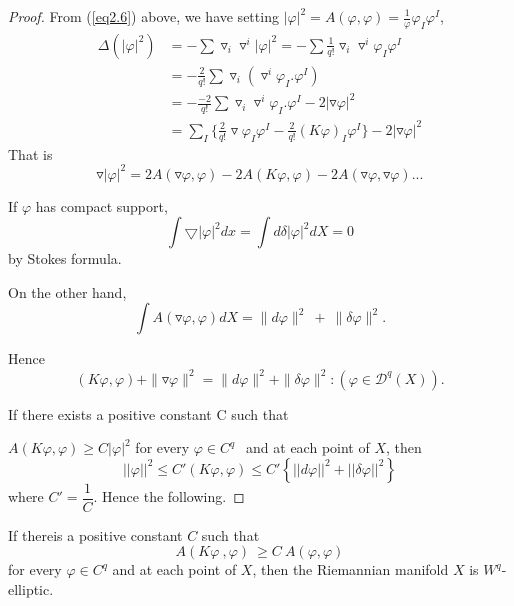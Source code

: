 \begin{proof}
  From (\ref{eq2.6}) above, we have setting $|\varphi |^2 =
  A(\varphi,\varphi)=\frac{1}{\varphi}\varphi_I \varphi^I$, 
  \begin{align*}
    \Delta(| \varphi |^2) & =-\sum \triangledown_i \triangledown^i
    |\varphi|^2 = - \sum \frac {1}{q!} \triangledown_i \triangledown^i
    \varphi_I \varphi^I\\ 
    &=-\frac{2}{q!}\sum \triangledown_i (\triangledown^i \varphi_I
    .\varphi^I)\\ 
    &=-\frac{-2}{q!}\sum \triangledown_i \triangledown^i \varphi_I
    .\varphi^I-2|\triangledown \varphi|^2\\ 
    &=\sum_I \bigg \{\frac {2}{q!} \triangledown \varphi_I \varphi^I
    - \frac{2}{q!}(K \varphi)_I \varphi^I\bigg \}-2|\triangledown
    \varphi|^2 
  \end{align*}
  That is
  $$ 
  \triangledown|\varphi|^2= 2 A(\triangledown \varphi,\varphi)-2A(K
  \varphi,\varphi)-2A (\triangledown \varphi, \triangledown
  \varphi)...
  $$ 

  If $\varphi$ has compact support,
  $$
  \int \bigtriangledown | \varphi|^2 dx=\int d \delta|\varphi|^2  dX=0
  $$ 
  by Stokes formula.

On the other hand,
  $$ 
  \int A (\triangledown \varphi, \varphi) dX = \parallel d \varphi
  \parallel^2~+ ~\parallel \delta \varphi \parallel^2.
  $$

  Hence
  $$ 
  (K \varphi,\varphi)+\parallel \triangledown \varphi \parallel^2 =
  \parallel d \varphi \parallel^2 +\parallel \delta \varphi
  \parallel^2:(\varphi \in \mathscr{D}^q(X)).
  $$

  If there exists a positive constant C such that
  
  $ A (K \varphi,\varphi)\ge C|\varphi|^2$ for every $\varphi \in C^q
  ~~ $ and at each point of $X$, then  
  $$ 
  ||\varphi||^2 \leq C' (K \varphi, \varphi) \leq C' \left\{ ||d
  \varphi||^2 + ||\delta \varphi||^2 \right\}
  $$
  where $C' = \dfrac{1}{C}$. Hence the following.
\end{proof}

\begin{lemma}\label{chap2:lem2.2}%
  If there\pageoriginale is a positive constant $C$ such  that
  $$ 
  A (K \varphi~,\varphi)~ \ge C~A(\varphi,\varphi)
  $$
  for every $\varphi \in C^q$ and at each point of $X$, then the
  Riemannian manifold $X$ is $W^q$-elliptic. 
\end{lemma}


